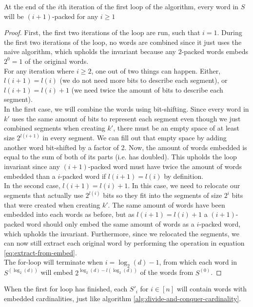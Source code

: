 \begin{invariant}
    At the end of the $i$th iteration of the first loop of the algorithm, every word in $S$ will be $(i+1)$-packed for any $i \geq 1$
\end{invariant}
\begin{proof}
    First, the first two iterations of the loop are run, such that $i=1$. During the first two iterations of the loop, no words are combined since it just uses the naive algorithm, which upholds the invariant because any $2$-packed words embeds $2^{0}=1$ of the original words.\\
    For any iteration where $i\geq 2$, one out of two things can happen. Either, $l(i+1) = l(i)$ (we do not need more bits to describe each segment), or $l(i + 1) = l(i) + 1$ (we need twice the amount of bits to describe each segment).\\
    In the first case, we will combine the words using bit-shifting. Since every word in $k'$ uses the same amount of bits to represent each segment even though we just combined segments when creating $k'$, there must be an empty space of at least size $2^{l(i+1)}$ in every segment. We can fill out that empty space by adding another word bit-shifted by a factor of 2.
    Now, the amount of words embedded is equal to the sum of both of its parts (i.e. has doubled). This upholds the loop invariant since any $(i+1)$-packed word must have twice the amount of words embedded than a $i$-packed word if $l(i+1) = l(i)$ by definition.\\
    In the second case, $l(i + 1) = l(i) + 1$. In this case, we need to relocate our segments that actually use $2^{l(i)}$ bits so they fit into the segments of size $2^i$ bits that were created when creating $k'$.
    The same amount of words have been embedded into each words as before, but as $l(i+1) = l(i) + 1$ a $(i+1)$-packed word should only embed the same amount of words as a $i$-packed word, which upholds the invariant.
    Furthermore, since we relocated the segments, we can now still extract each original word by performing the operation in equation \ref{eq:extract-from-embed}.\\
    The for-loop will terminate when $i = \log_2(d) - 1$, from which each word in $S^{(\log_2(d))}$ will embed $2^{\log_2(d)-l(\log_2(d))}$ of the words from $S^{(0)}$.
\end{proof}
When the first for loop has finished, each $S'_i$ for $i\in [n]$ will contain words with embedded cardinalities, just like algorithm \ref{alg:divide-and-conquer-cardinality}.

